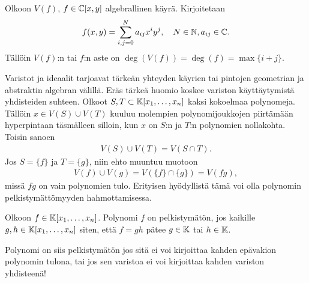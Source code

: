 \begin{maaritelma}
    Olkoon $V(f)$, $f\in\mathbb{C}[x,y]$ algebrallinen käyrä. Kirjoitetaan
    \begin{equation*}
        f(x,y)=\sum_{i,j=0}^{N}a_{ij}x^iy^j,\quad N\in\mathbb{N},a_{ij}\in\mathbb{C}.
    \end{equation*}
    Tällöin $V(f)$:n tai $f$:n aste on $\deg(V(f))=\deg(f)=\max\{i+j\}$.
\end{maaritelma}
Varistot ja ideaalit tarjoavat tärkeän yhteyden käyrien tai pintojen geometrian ja abstraktin algebran välillä. Eräs tärkeä huomio koskee variston käyttäytymistä yhdisteiden suhteen. Olkoot $S,T\subset\mathbb{K}[x_1,\dots,x_n]$ kaksi kokoelmaa polynomeja. Tällöin $x\in V(S)\cup V(T)$ kuuluu molempien polynomijoukkojen piirtämään hyperpintaan täsmälleen silloin, kun $x$ on $S$:n ja $T$:n polynomien nollakohta. Toisin sanoen
\begin{align*}
    V(S)\cup V(T)=V(S\cap T).
\end{align*}
Jos $S=\{f\}$ ja $T=\{g\}$, niin ehto muuntuu muotoon
\begin{align*}
    V(f)\cup V(g)=V(\{f\}\cap\{g\})=V(fg),
\end{align*}
missä $fg$ on vain polynomien tulo. Erityisen hyödyllistä tämä voi olla polynomin pelkistymättömyyden hahmottamisessa.
\begin{maaritelma}
    Olkoon $f\in\mathbb{K}[x_1,\dots,x_n]$. Polynomi $f$ on pelkistymätön, jos kaikille $g,h\in\mathbb{K}[x_1,\dots,x_n]$ siten, että $f=gh$ pätee $g\in\mathbb{K}$ tai $h\in\mathbb{K}$.
\end{maaritelma}
Polynomi on siis pelkistymätön jos sitä ei voi kirjoittaa kahden epävakion polynomin tulona, tai jos sen varistoa ei voi kirjoittaa kahden variston yhdisteenä!

